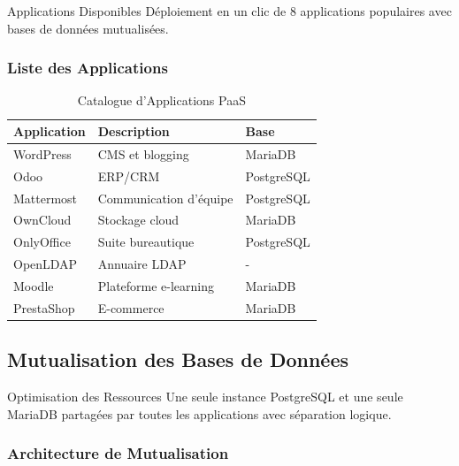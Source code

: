 \documentclass[12pt,a4paper]{article}
\begin{document}
\begin{infobox}{Applications Disponibles}
Déploiement en un clic de 8 applications populaires avec bases de données mutualisées.
\end{infobox}

\subsubsection{Liste des Applications}

\begin{table}[H]
\centering
\begin{tabularx}{\textwidth}{@{}lXl@{}}
\toprule
\textbf{Application} & \textbf{Description} & \textbf{Base} \\
\midrule
WordPress & CMS et blogging & MariaDB \\
Odoo & ERP/CRM & PostgreSQL \\
Mattermost & Communication d'équipe & PostgreSQL \\
OwnCloud & Stockage cloud & MariaDB \\
OnlyOffice & Suite bureautique & PostgreSQL \\
OpenLDAP & Annuaire LDAP & - \\
Moodle & Plateforme e-learning & MariaDB \\
PrestaShop & E-commerce & MariaDB \\
\bottomrule
\end{tabularx}
\caption{Catalogue d'Applications PaaS}
\end{table}

\subsection{Mutualisation des Bases de Données}

\begin{successbox}{Optimisation des Ressources}
Une seule instance PostgreSQL et une seule MariaDB partagées par toutes les applications avec séparation logique.
\end{successbox}

\subsubsection{Architecture de Mutualisation}
\end{document}
